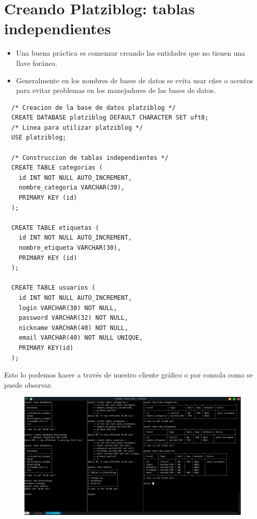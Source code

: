 \documentclass{article}
\begin{document}
\section{Creando Platziblog: tablas independientes}%
\begin{itemize}
  \item Una buena práctica es comenzar creando las entidades que no tienen una
    llave foránea.
  \item Generalmente en los nombres de bases de datos se evita usar eñes o
    acentos para evitar problemas en los manejadores de las bases de datos.
\end{itemize}

\begin{verbatim}
  /* Creacion de la base de datos platziblog */
  CREATE DATABASE platziblog DEFAULT CHARACTER SET uft8;
  /* Linea para utilizar platziblog */
  USE platziblog;
  
  /* Construccion de tablas independientes */
  CREATE TABLE categorias (
    id INT NOT NULL AUTO_INCREMENT,
    nombre_categoria VARCHAR(30),
    PRIMARY KEY (id)
  );

  CREATE TABLE etiquetas (
    id INT NOT NULL AUTO_INCREMENT,
    nombre_etiqueta VARCHAR(30),
    PRIMARY KEY (id)
  );

  CREATE TABLE usuarios (
    id INT NOT NULL AUTO_INCREMENT,
    login VARCHAR(30) NOT NULL,
    password VARCHAR(32) NOT NULL,
    nickname VARCHAR(40) NOT NULL,
    email VARCHAR(40) NOT NULL UNIQUE,
    PRIMARY KEY(id)
  );
\end{verbatim}

Esto lo podemos hacer a través de nuestro cliente gráfico o por consola como se puede observar.

\begin{figure}[h!]
  \centering
  \includegraphics[scale=0.50]{./Pictures/067_platziblog_ti.png}
\end{figure}
\end{document}
